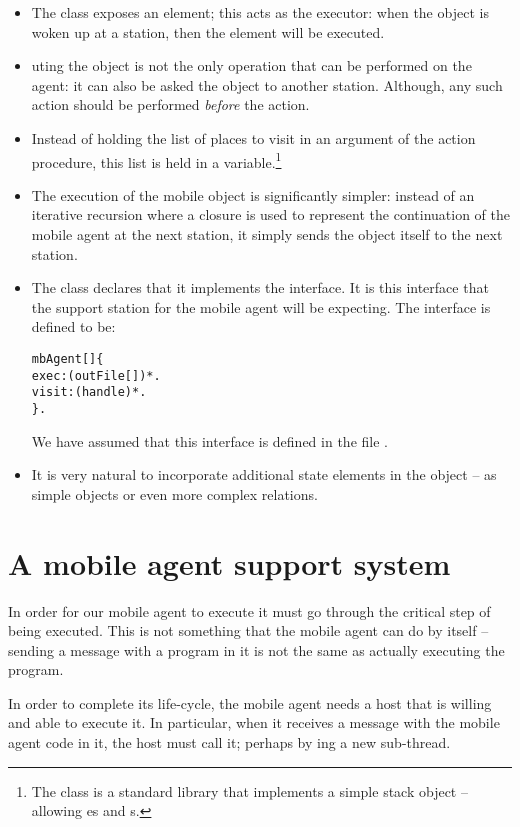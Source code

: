 \begin{itemize}
\item
The class exposes an  element; this acts as the  executor: when the object is woken up at a station, then the  element will be executed.
\item
{}uting the object is not the only operation that can be performed on the agent: it can also be asked the object to  another station. Although, any such action should be performed \emph{before} the  action.
\item
Instead of holding the list of places to visit in an argument of the  action procedure, this list is held in a  variable.\footnote{The  class is a standard library that implements a simple stack object -- allowing es and s.}
\item
The execution of the mobile object is significantly simpler: instead of an iterative recursion where a closure is used to represent the continuation of the mobile agent at the next station, it simply sends the object itself to the next station.
\item
The  class declares that it implements the  interface. It is this interface that the support station for the mobile agent will be expecting. The  interface is defined to be:
\begin{alltt}
mbAgent[] \cast \{
  exec:(outFile[])*.
  visit:(handle)*.
\}.
\end{alltt}
We have assumed that this interface is defined in the file .
\item
It is very natural to incorporate additional state elements in the object -- as simple  objects or even more complex  relations.
\end{itemize}

\section{A mobile agent support system}
\label{mobile:base}

In order for our mobile agent to execute it must go through the critical step of being executed. This is not something that the mobile agent can do by itself -- sending a message with a program in it is not the same as actually executing the program.

In order to complete its life-cycle, the mobile agent needs a host that is willing and able to execute it. In particular, when it receives a message with the mobile agent code in it, the host must call it; perhaps by ing a new sub-thread.


